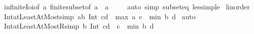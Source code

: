 \begin{isabellebody}
\ infinite{\isacharunderscore}{\kern0pt}Ioi{\isacharbrackleft}{\kern0pt}of\ a{\isacharbrackright}{\kern0pt}\ finite{\isacharunderscore}{\kern0pt}subset{\isacharbrackleft}{\kern0pt}of\ {\isachardoublequoteopen}{\isacharbraceleft}{\kern0pt}a\ {\isacharless}{\kern0pt}{\isachardot}{\kern0pt}{\isachardot}{\kern0pt}{\isacharbraceright}{\kern0pt}{\isachardoublequoteclose}\ {\isachardoublequoteopen}{\isacharbraceleft}{\kern0pt}a\ {\isachardot}{\kern0pt}{\isachardot}{\kern0pt}{\isacharbraceright}{\kern0pt}{\isachardoublequoteclose}{\isacharbrackright}{\kern0pt}\isanewline
\ \ \isamarkupfalse%
\ {\isacharparenleft}{\kern0pt}auto\ simp{\isacharcolon}{\kern0pt}\ subset{\isacharunderscore}{\kern0pt}eq\ less{\isacharunderscore}{\kern0pt}imp{\isacharunderscore}{\kern0pt}le{\isacharparenright}{\kern0pt}%
\endisatagproof
{\isafoldproof}%
%
\isadelimproof
%
\endisadelimproof
%
\isadelimdocument
%
\endisadelimdocument
%
\isatagdocument
%
\isamarkuptrue%
%
\endisatagdocument
{\isafolddocument}%
%
\isadelimdocument
%
\endisadelimdocument
{}\isamarkupfalse%
\ linorder\isanewline
{}\isanewline
\isanewline
{}\isamarkupfalse%
\ Int{\isacharunderscore}{\kern0pt}atLeastAtMost{\isacharbrackleft}{\kern0pt}simp{\isacharbrackright}{\kern0pt}{\isacharcolon}{\kern0pt}\ {\isachardoublequoteopen}{\isacharbraceleft}{\kern0pt}a{\isachardot}{\kern0pt}{\isachardot}{\kern0pt}b{\isacharbraceright}{\kern0pt}\ Int\ {\isacharbraceleft}{\kern0pt}c{\isachardot}{\kern0pt}{\isachardot}{\kern0pt}d{\isacharbraceright}{\kern0pt}\ {\isacharequal}{\kern0pt}\ {\isacharbraceleft}{\kern0pt}max\ a\ c\ {\isachardot}{\kern0pt}{\isachardot}{\kern0pt}\ min\ b\ d{\isacharbraceright}{\kern0pt}{\isachardoublequoteclose}\isanewline
%
\isadelimproof
%
\endisadelimproof
%
\isatagproof
{}\isamarkupfalse%
\ auto%
\endisatagproof
{\isafoldproof}%
%
\isadelimproof
\isanewline
%
\endisadelimproof
\isanewline
{}\isamarkupfalse%
\ Int{\isacharunderscore}{\kern0pt}atLeastAtMostR{}{\isacharbrackleft}{\kern0pt}simp{\isacharbrackright}{\kern0pt}{\isacharcolon}{\kern0pt}\ {\isachardoublequoteopen}{\isacharbraceleft}{\kern0pt}{\isachardot}{\kern0pt}{\isachardot}{\kern0pt}b{\isacharbraceright}{\kern0pt}\ Int\ {\isacharbraceleft}{\kern0pt}c{\isachardot}{\kern0pt}{\isachardot}{\kern0pt}d{\isacharbraceright}{\kern0pt}\ {\isacharequal}{\kern0pt}\ {\isacharbraceleft}{\kern0pt}c\ {\isachardot}{\kern0pt}{\isachardot}{\kern0pt}\ min\ b\ d{\isacharbraceright}{\kern0pt}{\isachardoublequoteclose}\isanewline

\end{isabellebody}
